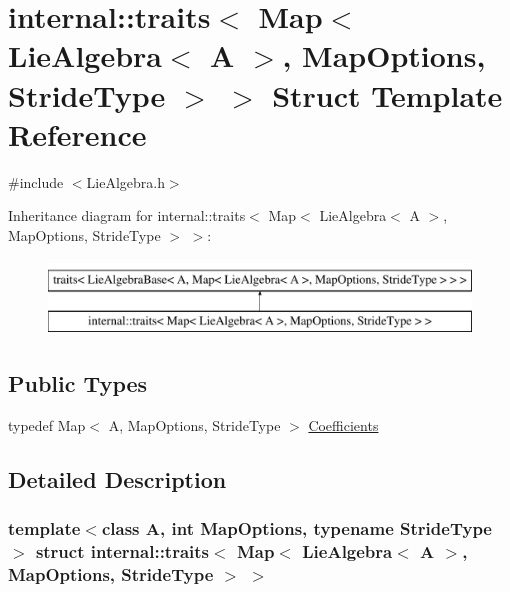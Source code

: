 \hypertarget{structinternal_1_1traits_3_01_map_3_01_lie_algebra_3_01_a_01_4_00_01_map_options_00_01_stride_type_01_4_01_4}{}\section{internal\+:\+:traits$<$ Map$<$ Lie\+Algebra$<$ A $>$, Map\+Options, Stride\+Type $>$ $>$ Struct Template Reference}
\label{structinternal_1_1traits_3_01_map_3_01_lie_algebra_3_01_a_01_4_00_01_map_options_00_01_stride_type_01_4_01_4}


{\ttfamily \#include $<$Lie\+Algebra.\+h$>$}

Inheritance diagram for internal\+:\+:traits$<$ Map$<$ Lie\+Algebra$<$ A $>$, Map\+Options, Stride\+Type $>$ $>$\+:\begin{figure}[H]
\begin{center}
\leavevmode
\includegraphics[height=2.000000cm]{structinternal_1_1traits_3_01_map_3_01_lie_algebra_3_01_a_01_4_00_01_map_options_00_01_stride_type_01_4_01_4}
\end{center}
\end{figure}
\subsection*{Public Types}
\begin{DoxyCompactItemize}
\item 
typedef Map$<$ A, Map\+Options, Stride\+Type $>$ \hyperlink{structinternal_1_1traits_3_01_map_3_01_lie_algebra_3_01_a_01_4_00_01_map_options_00_01_stride_type_01_4_01_4_a6d5295753fd15f374127373bcab1e504}{Coefficients}
\end{DoxyCompactItemize}


\subsection{Detailed Description}
\subsubsection*{template$<$class A, int Map\+Options, typename Stride\+Type$>$\newline
struct internal\+::traits$<$ Map$<$ Lie\+Algebra$<$ A $>$, Map\+Options, Stride\+Type $>$ $>$}



